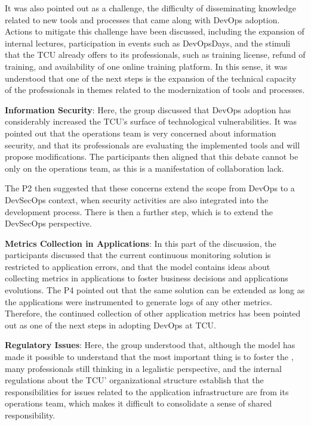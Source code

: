 It was also pointed out as a challenge, the difficulty of disseminating
knowledge related to new tools and processes that came along with DevOps adoption.
Actions to mitigate this challenge have been discussed, including the expansion
of internal lectures, participation in events such as DevOpsDays, and the stimuli
that the TCU already offers to its professionals, such as training license, refund
of training, and availability of one online training platform. In this sense,
it was understood that one of the next steps is the expansion of the technical
capacity of the professionals in themes related to the modernization of tools
and processes.

\textbf{Information Security}:
Here, the group discussed that DevOps adoption has considerably increased the
TCU's surface of technological vulnerabilities. It was pointed out that the
operations team is very concerned about information security, and that its
professionals are evaluating the implemented tools and will propose modifications.
The participants then aligned that this debate cannot be only on the operations
team, as this is a manifestation of collaboration lack.

The P2 then suggested that these concerns extend the scope from DevOps to a
DevSecOps context, when security activities are also integrated into the
development process. There is then a further step, which is to extend the
DevSecOps perspective.

\textbf{Metrics Collection in Applications}:
In this part of the discussion, the participants discussed that the current
continuous monitoring solution is restricted to application errors, and that
the model contains ideas about collecting metrics in applications to foster
business decisions and applications evolutions. The P4 pointed out that the same
solution can be extended as long as the applications were instrumented to
generate logs of any other metrics. Therefore, the continued collection of
other application metrics has been pointed out as one of the next steps in
adopting DevOps at TCU.

\textbf{Regulatory Issues}:
Here, the group understood that, although the model has made it possible to
understand that the most important thing is to foster the \cc, many professionals
still thinking in a legalistic perspective, and the internal regulations about
the TCU' organizational structure establish that the responsibilities for issues
related to the application infrastructure are from its operations team,
which makes it difficult to consolidate a sense of shared responsibility.

